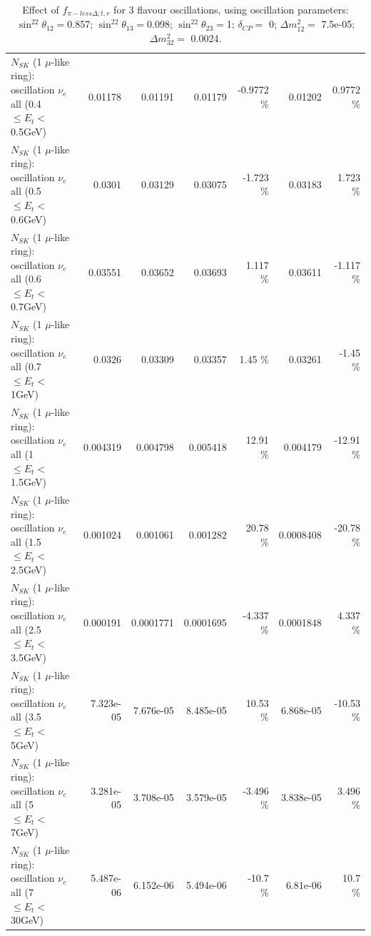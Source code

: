 \begin{table}
\begin{tabular}{| l | r | r | r  r | r  r |}
$N_{SK}$ (1 $\mu$-like ring): oscillation $\nu_{e}$ all (0.4 $\leq E_{t} <$ 0.5GeV) &         0.01178 &         0.01191 &         0.01179 &  -0.9772 \%  &         0.01202 &   0.9772 \%  \\ 
$N_{SK}$ (1 $\mu$-like ring): oscillation $\nu_{e}$ all (0.5 $\leq E_{t} <$ 0.6GeV) &          0.0301 &         0.03129 &         0.03075 &   -1.723 \%  &         0.03183 &    1.723 \%  \\ 
$N_{SK}$ (1 $\mu$-like ring): oscillation $\nu_{e}$ all (0.6 $\leq E_{t} <$ 0.7GeV) &         0.03551 &         0.03652 &         0.03693 &    1.117 \%  &         0.03611 &   -1.117 \%  \\ 
$N_{SK}$ (1 $\mu$-like ring): oscillation $\nu_{e}$ all (0.7 $\leq E_{t} <$ 1GeV) &          0.0326 &         0.03309 &         0.03357 &     1.45 \%  &         0.03261 &    -1.45 \%  \\ 
$N_{SK}$ (1 $\mu$-like ring): oscillation $\nu_{e}$ all (1 $\leq E_{t} <$ 1.5GeV) &        0.004319 &        0.004798 &        0.005418 &    12.91 \%  &        0.004179 &   -12.91 \%  \\ 
$N_{SK}$ (1 $\mu$-like ring): oscillation $\nu_{e}$ all (1.5 $\leq E_{t} <$ 2.5GeV) &        0.001024 &        0.001061 &        0.001282 &    20.78 \%  &       0.0008408 &   -20.78 \%  \\ 
$N_{SK}$ (1 $\mu$-like ring): oscillation $\nu_{e}$ all (2.5 $\leq E_{t} <$ 3.5GeV) &        0.000191 &       0.0001771 &       0.0001695 &   -4.337 \%  &       0.0001848 &    4.337 \%  \\ 
$N_{SK}$ (1 $\mu$-like ring): oscillation $\nu_{e}$ all (3.5 $\leq E_{t} <$ 5GeV) &       7.323e-05 &       7.676e-05 &       8.485e-05 &    10.53 \%  &       6.868e-05 &   -10.53 \%  \\ 
 $N_{SK}$ (1 $\mu$-like ring): oscillation $\nu_{e}$ all (5 $\leq E_{t} <$ 7GeV) &       3.281e-05 &       3.708e-05 &       3.579e-05 &   -3.496 \%  &       3.838e-05 &    3.496 \%  \\ 
$N_{SK}$ (1 $\mu$-like ring): oscillation $\nu_{e}$ all (7 $\leq E_{t} <$ 30GeV) &       5.487e-06 &       6.152e-06 &       5.494e-06 &    -10.7 \%  &        6.81e-06 &     10.7 \%  \\ 
\hline
\hline
\end{tabular}
\caption{ Effect of $f_{\pi-less\Delta; t, r}$ for 3 flavour oscillations, using oscillation parameters:  $\sin^22\theta_{12} = $0.857; $\sin^22\theta_{13} = $0.098; $\sin^22\theta_{23} = $1; $\delta_{CP} = $        0; $\Delta m^2_{12} = $    7.5e-05; $\Delta m^2_{32} = $    0.0024. }
\label{tab:num_xsec_pilessdelta_1RmuT_3f_osc_t13:0.098}
\end{table}
